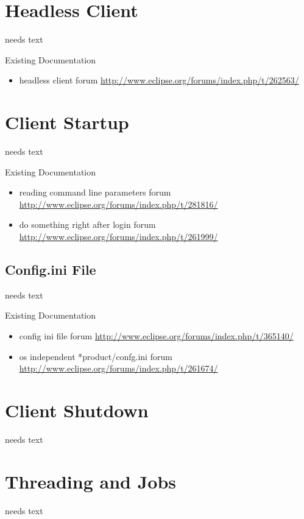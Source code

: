\documentclass[a4paper,10pt,twoside]{book}
\begin{document}
\section{Headless Client}
needs text

\noindent Existing Documentation
\begin{itemize}
  \item headless client forum \url{http://www.eclipse.org/forums/index.php/t/262563/}
\end{itemize}

\section{Client Startup}
needs text

\noindent Existing Documentation
\begin{itemize}
  \item reading command line parameters forum \url{http://www.eclipse.org/forums/index.php/t/281816/}
  \item do something right after login forum \url{http://www.eclipse.org/forums/index.php/t/261999/}
\end{itemize}

\subsection{Config.ini File}
needs text

\noindent Existing Documentation
\begin{itemize}
  \item config ini file forum \url{http://www.eclipse.org/forums/index.php/t/365140/}
  \item os independent *product/confg.ini forum \url{http://www.eclipse.org/forums/index.php/t/261674/}
\end{itemize}

\section{Client Shutdown}
needs text

\section{Threading and Jobs}
needs text
\end{document}
